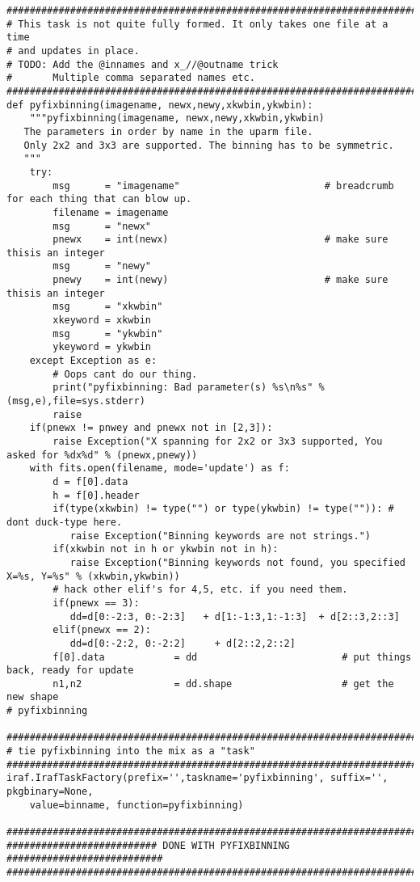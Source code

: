 {\begin{verbatim}
#############################################################################
# This task is not quite fully formed. It only takes one file at a time
# and updates in place.
# TODO: Add the @innames and x_//@outname trick
#       Multiple comma separated names etc.
#############################################################################
def pyfixbinning(imagename, newx,newy,xkwbin,ykwbin):
    """pyfixbinning(imagename, newx,newy,xkwbin,ykwbin)
   The parameters in order by name in the uparm file.
   Only 2x2 and 3x3 are supported. The binning has to be symmetric.
   """
    try:
        msg      = "imagename"                         # breadcrumb for each thing that can blow up.
        filename = imagename
        msg      = "newx"
        pnewx    = int(newx)                           # make sure thisis an integer
        msg      = "newy"
        pnewy    = int(newy)                           # make sure thisis an integer
        msg      = "xkwbin"
        xkeyword = xkwbin
        msg      = "ykwbin"
        ykeyword = ykwbin
    except Exception as e:
        # Oops cant do our thing.
        print("pyfixbinning: Bad parameter(s) %s\n%s" % (msg,e),file=sys.stderr)
        raise
    if(pnewx != pnwey and pnewx not in [2,3]):
        raise Exception("X spanning for 2x2 or 3x3 supported, You asked for %dx%d" % (pnewx,pnewy))
    with fits.open(filename, mode='update') as f:
        d = f[0].data
        h = f[0].header
        if(type(xkwbin) != type("") or type(ykwbin) != type("")): # dont duck-type here.
           raise Exception("Binning keywords are not strings.")
        if(xkwbin not in h or ykwbin not in h):
           raise Exception("Binning keywords not found, you specified X=%s, Y=%s" % (xkwbin,ykwbin))
        # hack other elif's for 4,5, etc. if you need them.
        if(pnewx == 3):
           dd=d[0:-2:3, 0:-2:3]   + d[1:-1:3,1:-1:3]  + d[2::3,2::3]
        elif(pnewx == 2):
           dd=d[0:-2:2, 0:-2:2]     + d[2::2,2::2]
        f[0].data            = dd                         # put things back, ready for update
        n1,n2                = dd.shape                   # get the new shape
# pyfixbinning

#############################################################################
# tie pyfixbinning into the mix as a "task"
#############################################################################
iraf.IrafTaskFactory(prefix='',taskname='pyfixbinning', suffix='', pkgbinary=None,
    value=binname, function=pyfixbinning)

#############################################################################
########################## DONE WITH PYFIXBINNING ###########################
#############################################################################


\end{verbatim}}
